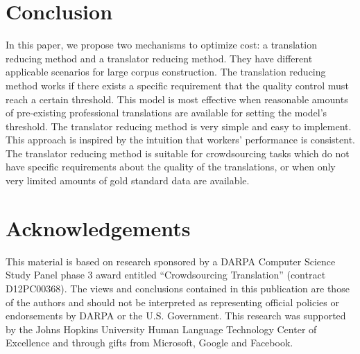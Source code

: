 \documentclass[11pt,letterpaper]{article}
\begin{document}
\section{Conclusion}
In this paper, we propose two mechanisms to optimize cost: a translation reducing method and a translator reducing method. They have different applicable scenarios for large corpus construction.
The translation reducing method works if there exists a specific requirement that the quality control must reach a certain threshold. 
This model is most effective when reasonable amounts of pre-existing professional translations are available for setting the model's threshold. 
The translator reducing method is very simple and easy to implement. This approach is inspired by the intuition that workers' performance is consistent. The translator reducing method is suitable for crowdsourcing tasks which do not have specific requirements about the quality of the translations, 
or when only very limited amounts of gold standard data are available.

\section*{Acknowledgements}

This material is based on research sponsored by a DARPA Computer Science Study Panel phase 3 award entitled ``Crowdsourcing Translation'' (contract D12PC00368). The views and conclusions contained in this publication are those of the authors and should not be interpreted as representing official policies or endorsements by DARPA or the U.S. Government. This research was supported by the Johns Hopkins University Human Language Technology Center of Excellence and through gifts from Microsoft, Google and Facebook.

 

\end{document}
